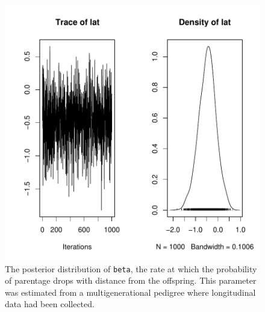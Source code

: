 \documentclass{article}
\begin{document}
\begin{figure}[!h]
\begin{center}
\includegraphics{Tutorial-095}
\end{center}
\caption{The posterior distribution of \texttt{beta}, the rate at which the probability of parentage drops with distance from the offspring.  This parameter was estimated from a multigenerational pedigree where longitudinal data had been collected.}
\label{MGped}
\end{figure}
\end{document}
